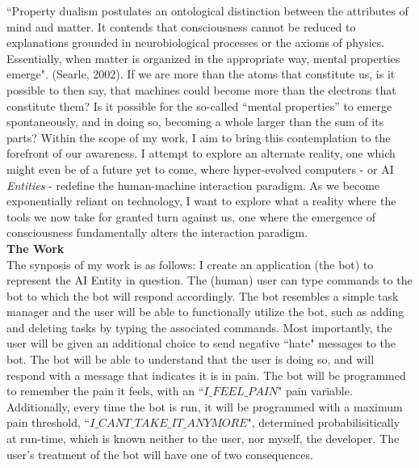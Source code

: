 \documentclass[11pt]{article}
\begin{document}
``Property dualism postulates an ontological distinction between the attributes of mind and matter. It contends that consciousness cannot be reduced to explanations grounded in neurobiological processes or the axioms of physics. Essentially, when matter is organized in the appropriate way, mental properties emerge". (Searle, 2002). If we are more than the atoms that constitute us, is it possible to then say, that machines could become more than the electrons that constitute them? Is it possible for the so-called “mental properties” to emerge spontaneously, and in doing so, becoming a whole larger than the sum of its parts? Within the scope of my work, I aim to bring this contemplation to the forefront of our awareness. I attempt to explore an alternate reality, one which might even be of a future yet to come, where hyper-evolved computers - or AI \textit{Entities} -  redefine the human-machine interaction paradigm. As we become exponentially reliant on technology, I want to explore what a reality where the tools we now take for granted turn against us, one where the emergence of consciousness fundamentally alters the interaction paradigm. \\

\textbf{\Large The Work} \\

The synposis of my work is as follows: I create an application (the bot) to represent the AI Entity in question. The (human) user can type commands to the bot to which the bot will respond accordingly. The bot resembles a simple task manager and the user will be able to functionally utilize the bot, such as adding and deleting tasks by typing the associated commands. Most importantly, the user will be given an additional choice to send negative ``hate" messages to the bot. The bot will be able to understand that the user is doing so, and will respond with a message that indicates it is in pain. The bot will be programmed to remember the pain it feels, with an ``${I\_FEEL\_PAIN}$" pain variable. Additionally, every time the bot is run, it will be programmed with a maximum pain threshold, ``${I\_CANT\_TAKE\_IT\_ANYMORE}$", determined probabilisitically at run-time, which is known neither to the user, nor myself, the developer. The user's treatment of the bot will have one of two consequences. \\
\end{document}
